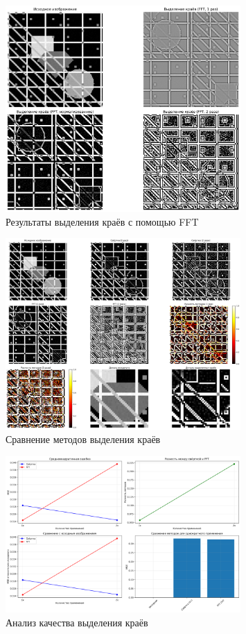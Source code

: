 \begin{figure}[H]
    \centering
    \includegraphics[width=0.8\textwidth]{images/task4/fft_results.png}
    \caption{Результаты выделения краёв с помощью FFT}
    \label{fig:fft_edge}
\end{figure}

\begin{figure}[H]
    \centering
    \includegraphics[width=0.8\textwidth]{images/task4/method_comparison.png}
    \caption{Сравнение методов выделения краёв}
    \label{fig:method_comparison_edge}
\end{figure}

\begin{figure}[H]
    \centering
    \includegraphics[width=0.8\textwidth]{images/task4/quality_analysis.png}
    \caption{Анализ качества выделения краёв}
    \label{fig:quality_analysis_edge}
\end{figure}

